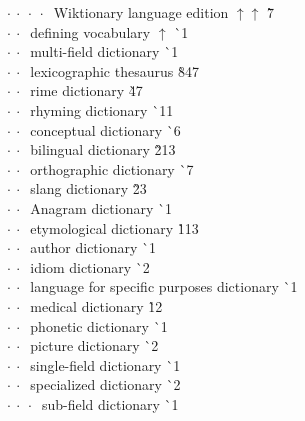 \begin{tabbing}
$\cdot\:\cdot\:\cdot\:\cdot\:$  Wiktionary language edition $\uparrow\uparrow$ \` 7\\
$\cdot\:\cdot\:$  defining vocabulary $\uparrow$ \` {\raisebox{.4\height}{\scalebox{.6}{+}}}1\\
$\cdot\:\cdot\:$  multi-field dictionary  \` {\raisebox{.4\height}{\scalebox{.6}{+}}}1\\
$\cdot\:\cdot\:$  lexicographic thesaurus  \` 8{\raisebox{.4\height}{\scalebox{.6}{+}}}47\\
$\cdot\:\cdot\:$  rime dictionary  \` 4{\raisebox{.4\height}{\scalebox{.6}{+}}}7\\
$\cdot\:\cdot\:$  rhyming dictionary  \` {\raisebox{.4\height}{\scalebox{.6}{+}}}11\\
$\cdot\:\cdot\:$  conceptual dictionary  \` {\raisebox{.4\height}{\scalebox{.6}{+}}}6\\
$\cdot\:\cdot\:$  bilingual dictionary  \` 2{\raisebox{.4\height}{\scalebox{.6}{+}}}13\\
$\cdot\:\cdot\:$  orthographic dictionary  \` {\raisebox{.4\height}{\scalebox{.6}{+}}}7\\
$\cdot\:\cdot\:$  slang dictionary  \` 2{\raisebox{.4\height}{\scalebox{.6}{+}}}3\\
$\cdot\:\cdot\:$  Anagram dictionary  \` {\raisebox{.4\height}{\scalebox{.6}{+}}}1\\
$\cdot\:\cdot\:$  etymological dictionary  \` 1{\raisebox{.4\height}{\scalebox{.6}{+}}}13\\
$\cdot\:\cdot\:$  author dictionary  \` {\raisebox{.4\height}{\scalebox{.6}{+}}}1\\
$\cdot\:\cdot\:$  idiom dictionary  \` {\raisebox{.4\height}{\scalebox{.6}{+}}}2\\
$\cdot\:\cdot\:$  language for specific purposes dictionary  \` {\raisebox{.4\height}{\scalebox{.6}{+}}}1\\
$\cdot\:\cdot\:$  medical dictionary  \` 1{\raisebox{.4\height}{\scalebox{.6}{+}}}2\\
$\cdot\:\cdot\:$  phonetic dictionary  \` {\raisebox{.4\height}{\scalebox{.6}{+}}}1\\
$\cdot\:\cdot\:$  picture dictionary  \` {\raisebox{.4\height}{\scalebox{.6}{+}}}2\\
$\cdot\:\cdot\:$  single-field dictionary  \` {\raisebox{.4\height}{\scalebox{.6}{+}}}1\\
$\cdot\:\cdot\:$  specialized dictionary  \` {\raisebox{.4\height}{\scalebox{.6}{+}}}2\\
$\cdot\:\cdot\:\cdot\:$  sub-field dictionary  \` {\raisebox{.4\height}{\scalebox{.6}{+}}}1\\

\end{tabbing}

